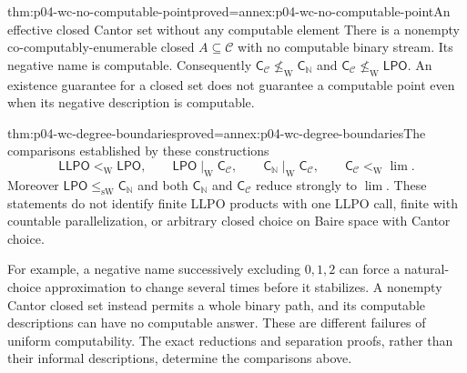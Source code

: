 \begin{hbtheorem}{thm:p04-wc-no-computable-point}{proved=annex:p04-wc-no-computable-point}{An effective closed Cantor set without any computable element}
There is a nonempty co-computably-enumerable closed
\(A\subseteq\mathcal C\) with no computable binary stream.
Its negative name is computable. Consequently
\(\mathsf{C}_{\mathcal C}\not\leq_{\mathrm W} \mathsf{C}_{\mathbb N}\) and
\(\mathsf{C}_{\mathcal C}\not\leq_{\mathrm W}\mathsf{LPO}\).
An existence guarantee for a closed set does not guarantee a computable
point even when its negative description is computable.
\end{hbtheorem}

\begin{hbtheorem}{thm:p04-wc-degree-boundaries}{proved=annex:p04-wc-degree-boundaries}{The comparisons established by these constructions}
\[
 \mathsf{LLPO}<_{\mathrm W}\mathsf{LPO},\qquad
 \mathsf{LPO}\mid_{\mathrm W} \mathsf{C}_{\mathcal C},\qquad
 \mathsf{C}_{\mathbb N}\mid_{\mathrm W} \mathsf{C}_{\mathcal C},\qquad
 \mathsf{C}_{\mathcal C}<_{\mathrm W}\lim.
\]
Moreover \(\mathsf{LPO}\leq_{\mathrm{sW}}\mathsf{C}_{\mathbb N}\) and both
\(\mathsf{C}_{\mathbb N}\) and \(\mathsf{C}_{\mathcal C}\) reduce strongly to
\(\lim\). These statements do not identify finite LLPO products
with one LLPO call, finite with countable parallelization, or arbitrary
closed choice on Baire space with Cantor choice.
\end{hbtheorem}

For example, a negative name successively excluding \(0,1,2\) can
force a natural-choice approximation to change several times before it
stabilizes. A nonempty Cantor closed set instead permits a whole binary
path, and its computable descriptions can have no computable answer.
These are different failures of uniform computability. The exact
reductions and separation proofs, rather than their informal descriptions,
determine the comparisons above.
